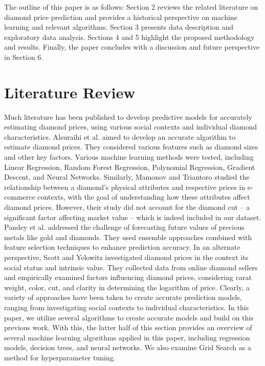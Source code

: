\documentclass[conference]{IEEEtran}
\begin{document}
The outline of this paper is as follows: Section 2 reviews the related literature on diamond price prediction and provides a historical perspective on machine learning and relevant algorithms. Section 3 presents data description and exploratory data analysis. Sections 4 and 5 highlight the proposed methodology and results. Finally, the paper concludes with a discussion and future perspective in Section 6.

\section{Literature Review}

Much literature has been published to develop predictive models for accurately estimating diamond prices, using various social contexts and individual diamond characteristics. Alsuraihi et al. \cite{Alsuraihi} aimed to develop an accurate algorithm to estimate diamond prices. They considered various features such as diamond sizes and other key factors. Various machine learning methods were tested, including Linear Regression, Random Forest Regression, Polynomial Regression, Gradient Descent, and Neural Networks. Similarly, Mamonov and Triantoro \cite{Mamonov} studied the relationship between a diamond's physical attributes and respective prices in e-commerce contexts, with the goal of understanding how these attributes affect diamond prices. However, their study did not account for the diamond cut – a significant factor affecting market value – which is indeed included in our dataset. Pandey et al. \cite{Pandey} addressed the challenge of forecasting future values of precious metals like gold and diamonds. They used ensemble approaches combined with feature selection techniques to enhance prediction accuracy. In an alternate perspective, Scott and Yelowitz \cite{Scott} investigated diamond prices in the context its social status and intrinsic value. They collected data from online diamond sellers and empirically examined factors influencing diamond prices, considering carat weight, color, cut, and clarity in determining the logarithm of price. Clearly, a variety of approaches have been taken to create accurate prediction models, ranging from investigating social contexts to individual characteristics. In this paper, we utilize several algorithms to create accurate models and build on this previous work. With this, the latter half of this section provides an overview of several machine learning algorithms applied in this paper, including regression models, decision trees, and neural networks. We also examine Grid Search as a method for hyperparameter tuning.
\end{document}
